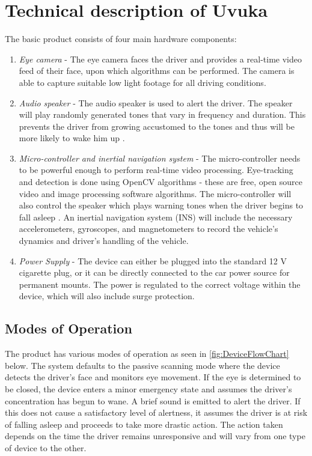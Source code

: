 \section{Technical description of Uvuka}
\label{sec:Technical description of Uvuka}
The basic product consists of four main hardware components:
\begin{enumerate}
  \item \textit{Eye camera} - The eye camera faces the driver and provides a real-time video feed of their face, upon which algorithms can be performed. The camera is able to capture suitable low light footage for all driving conditions.
  \item \textit{Audio speaker} - The audio speaker is used to alert the driver. The speaker will play randomly generated tones that vary in frequency and duration. This prevents the driver from growing accustomed to the tones and thus will be more likely to wake him up \cite{Habituation}.
  \item \textit{Micro-controller and inertial navigation system} - The micro-controller needs to be powerful enough to perform real-time video processing. Eye-tracking and detection is done using OpenCV algorithms - these are free, open source video and image processing software algorithms. The micro-controller will also control the speaker which plays warning tones when the driver begins to fall asleep \cite{OpenCV}. An inertial navigation system (INS) will include the necessary accelerometers, gyroscopes, and magnetometers to record the vehicle's dynamics and driver's handling of the vehicle.
  \item \textit{Power Supply} - The device can either be plugged into the standard 12 V cigarette plug, or it can be directly connected to the car power source for permanent mounts. The power is regulated to the correct voltage within the device, which will also include surge protection.
\end{enumerate}

\newpage 
\subsection{Modes of Operation}
The product has various modes of operation as seen in \cref{fig:DeviceFlowChart} below. The system defaults to the passive scanning mode where the device detects the driver's face and monitors eye movement. If the eye is determined to be closed, the device  enters a minor emergency state and assumes the driver's concentration has begun to wane. A brief sound is emitted to alert the driver. If this does not cause a satisfactory level of alertness, it assumes the driver is at risk of falling asleep and proceeds to take more drastic action. The action taken depends on the time the driver remains unresponsive and will vary from one type of device to the other.

